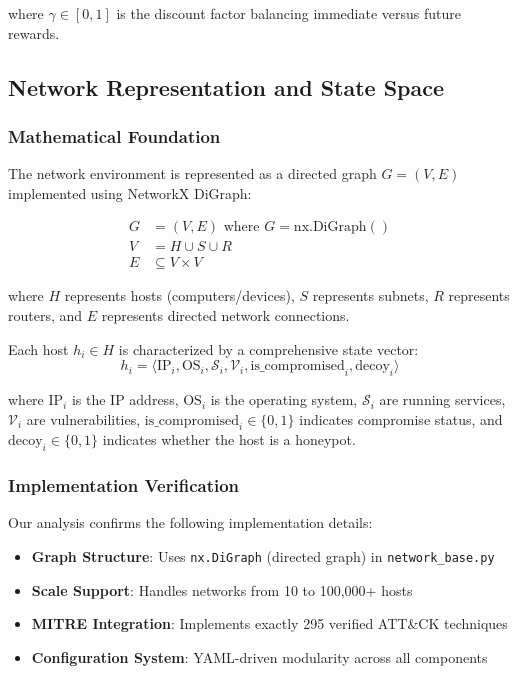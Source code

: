 \documentclass[11pt]{article}
\theoremstyle{definition}
\theoremstyle{plain}
\newcommand{\MC}[1]{\mathcal{#1}}
\begin{document}
where $\gamma \in [0,1]$ is the discount factor balancing immediate versus future rewards.

\subsection{Network Representation and State Space}

\subsubsection{Mathematical Foundation}
The network environment is represented as a directed graph $G = (V, E)$ implemented using NetworkX DiGraph:

\begin{align}
G &= (V, E) \text{ where } G = \text{nx.DiGraph}() \\
V &= H \cup S \cup R \\
E &\subseteq V \times V
\end{align}

where $H$ represents hosts (computers/devices), $S$ represents subnets, $R$ represents routers, and $E$ represents directed network connections.

Each host $h_i \in H$ is characterized by a comprehensive state vector:
\begin{equation}
h_i = \langle \text{IP}_i, \text{OS}_i, \MC{S}_i, \MC{V}_i, \text{is\_compromised}_i, \text{decoy}_i \rangle
\end{equation}

where $\text{IP}_i$ is the IP address, $\text{OS}_i$ is the operating system, $\MC{S}_i$ are running services, $\MC{V}_i$ are vulnerabilities, $\text{is\_compromised}_i \in \{0,1\}$ indicates compromise status, and $\text{decoy}_i \in \{0,1\}$ indicates whether the host is a honeypot.

\subsubsection{Implementation Verification}
Our analysis confirms the following implementation details:
\begin{itemize}
    \item \textbf{Graph Structure}: Uses \texttt{nx.DiGraph} (directed graph) in \texttt{network\_base.py}
    \item \textbf{Scale Support}: Handles networks from 10 to 100,000+ hosts
    \item \textbf{MITRE Integration}: Implements exactly 295 verified ATT\&CK techniques
    \item \textbf{Configuration System}: YAML-driven modularity across all components
\end{itemize}
\end{document}
